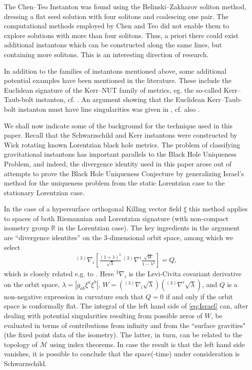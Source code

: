 \documentclass[a4paper,10pt,reqno]{amsart}
\newcommand{\cM}{\mathcal{M}}
\theoremstyle{plain}
\numberwithin{equation}{section}
\begin{document}
The Chen--Teo Instanton was found using the Belinski--Zakha\-rov soliton method, dressing a flat seed solution with four solitons and coalescing one pair. The computational methods employed by Chen and Teo did not enable them to explore solutions with more than four solitons. Thus, a priori there could exist additional instantons which can be constructed along the same lines, but containing more solitons. This  is an interesting direction of research. 

In addition to the families of instantons mentioned above, some additional potential examples have been mentioned in the literature. These include the Euclidean signature of the Kerr--NUT family of metrics, eg. the so-called Kerr--Taub-bolt instanton, cf. \cite[\S III]{gibbons:perry:1980}. An argument showing that the Euclidean Kerr--Taub-bolt  instanton
%
must have line singularities was given in \cite[\S 4.8] {2010NuPhB.838..207C}, cf. also  \cite[Appendix A]{clement2020smarr}.

We shall now indicate some of the background for the technique used in this paper. Recall that the Schwarzschild and Kerr instantons were constructed by Wick rotating known Lorentzian black hole metrics. The problem of classifying gravitational instantons has important parallels to the Black Hole Uniqueness Problem, and indeed, the divergence identity used in this paper arose out of attempts to prove the Black Hole Uniqueness Conjecture by  generalizing Israel's method \cite{1967PhRv..164.1776I,MR398432,1977GReGr...8..695R} for the uniqueness problem from the static Lorentzian case to the stationary Lorentzian case. 


In the case of a  hypersurface orthogonal Killing vector field $\xi$ this method applies to spaces of both Riemannian and Lorentzian signature (with non-compact isometry group $\mathbb{R}$ in the Lorentzian case).  The key ingredients in the argument are ``divergence identites'' on the 3-dimensional orbit space, among which we select
\begin{align}
 \label{eq:Israel} %
  {}^{(3)}\nabla_i \left[ \frac{(1 + \lambda)^2}{\sqrt{\lambda}} \, {}^{(3)}\nabla^i \frac{\sqrt{W}}{1 - \lambda^2}\right] = Q,    \end{align} 
  which is closely related e.g. to \cite[Eqs. (2.12)-(2.13)]{MR398432}. Here ${}^3\nabla_i$ is the Levi-Civita covariant derivative on the orbit space, $\lambda  = |g_{ab}\xi^a \xi^b|$,  $W = ({}^{(3)}\nabla_i  \sqrt{\lambda})({}^{(3)} \nabla^i \sqrt{\lambda})$, and $Q$ is  a non-negative expression in curvature 
such that $Q = 0$ if and only if the orbit space is conformally flat.  
The integral of the left hand side of \eqref{eq:Israel} can, after dealing with potential singularities resulting from possible  zeros of $W$, be evaluated in terms of contributions from infinity and from the ``surface gravities" (the fixed point data of the isometry). The latter, in turn, can be related to the topology of $\cM$ using index theorems. In case the result is that the left hand side vanishes, it is possible to conclude that the space(-time) under consideration is Schwarzschild.
\end{document}
